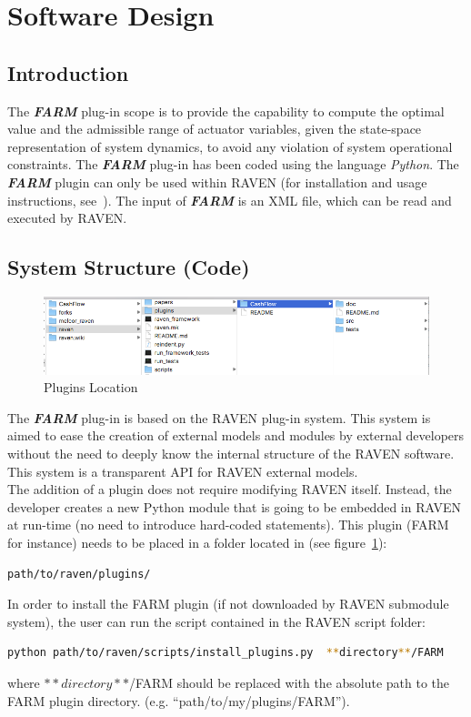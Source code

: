 \section{Software Design}
\subsection{Introduction}
The \textit{\textbf{FARM}} plug-in scope is to provide the capability to compute the optimal value and the admissible range of 
actuator variables, given the state-space representation of system dynamics, to avoid any violation of system operational 
constraints.
The \textit{\textbf{FARM}} plug-in has been coded using the language \emph{Python}. The \textit{\textbf{FARM}} plugin 
can only be used within RAVEN (for installation and usage instructions, see~\cite{RAVENuserManual}).
The input of  \textit{\textbf{FARM}} is an XML file, which can be read and executed by RAVEN.


\subsection{System Structure (Code)}
\begin{figure}
\centering
\includegraphics[width=1.0\textwidth]{pics/plugins_location.png}
\caption{Plugins Location}
\label{fig:pluginsLocation}
\end{figure}

The  \textit{\textbf{FARM}} plug-in is based on the RAVEN plug-in system. This system is aimed to ease the creation
of external models and modules by external developers without the need to deeply know the internal structure
of the RAVEN software. This system is a transparent API for RAVEN external models.
\\The addition of a plugin does not require modifying RAVEN itself. 
Instead, the developer creates a new Python module that is going to be embedded
 in RAVEN at run-time (no need to introduce  hard-coded statements).
 This plugin (FARM for instance) needs to be placed in a folder  located in (see figure~\ref{fig:pluginsLocation}):
\begin{lstlisting}[language=bash]
 path/to/raven/plugins/
\end{lstlisting}
In order to install the FARM plugin (if not downloaded by RAVEN submodule system),
 the user can run the script contained in the RAVEN script folder:
\begin{lstlisting}[language=bash]
 python path/to/raven/scripts/install_plugins.py  **directory**/FARM
\end{lstlisting}
where  $**directory**$/FARM should be replaced with the absolute path to the FARM plugin directory.
(e.g. ``path/to/my/plugins/FARM'').

